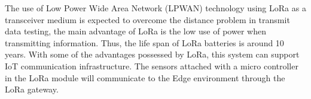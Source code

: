 The use of Low Power Wide Area Network (LPWAN) technology using LoRa as a transceiver medium is expected to overcome the distance problem in transmit data testing,
	the main advantage of LoRa is the low use of power when transmitting information.
Thus,
	the life span of LoRa batteries is around 10 years.
With some of the advantages possessed by LoRa,
	this system can support IoT communication infrastructure.
The sensors attached with a micro controller in the LoRa module will communicate to the Edge environment through the LoRa gateway.




\printbibliography


